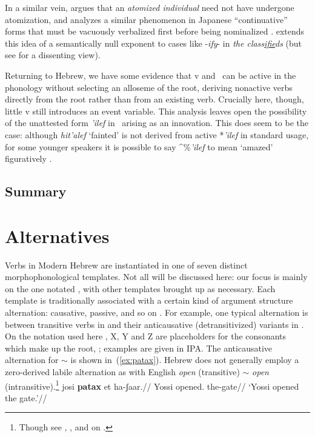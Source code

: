 In a similar vein, \cite{marantz13} argues that an \emph{atomized individual} need not have undergone atomization, and analyzes a similar phenomenon in Japanese ``continuative'' forms that must be vacuously verbalized first{ before being nominalized} \citep{volpe05}. \cite{anagnostopoulou14thli} extends this idea of a semantically null exponent to cases like -\emph{ify}- in \emph{the class\underline{ifie}ds} (but see \citealt{borer14lingua} for a dissenting view).

Returning to Hebrew, we have some evidence that v and \va~can be active in the phonology without selecting an alloseme of the root, deriving nonactive verbs directly from the root rather than from an existing verb. Crucially here, though, little v still introduces an event variable. This analysis leaves open the possibility of the unattested form \emph{'ilef} in \tpie~arising as an innovation. This does seem to be the case: although \emph{hit'alef} `fainted' is not derived from active *\emph{'ilef} in standard usage, for some younger speakers it is possible to say ^{\%}\emph{'ilef} to mean `amazed' figuratively \citep{laks14}.

	\subsection{Summary}


\section{Alternatives} \label{vz:others}
Verbs in Modern Hebrew are instantiated in one of seven distinct morphophonological templates. Not all will be discussed here: our focus is mainly on the one notated {\thit}, with other templates brought up as necessary. Each template is traditionally associated with a certain kind of argument structure alternation: causative, passive, and so on \citep{berman78,doron03,arad05,borer13oup,kastner16phd}. For example, one typical alternation is between transitive verbs in {\tkal} and their anticausative (detransitivized) variants in {\tnif}. On the notation used here , X, Y and Z are placeholders for the consonants which make up the root, ; examples are given in IPA. The anticausative alternation for {\tkal}$\sim${\tnif} is shown in~(\ref{ex:patax}). Hebrew does not generally employ a zero-derived labile alternation as with English \emph{open} (transitive) $\sim$ \emph{open} (intransitive).\footnote{Though see \cite{borer91}, \citet[61]{doron03}, \cite{lev15} and \citet[Chapter~2.3.2]{kastner16phd} on {\thif}.} 
\pex\label{ex:patax}
	\a \begingl
		\gla josi \textbf{patax} et ha-ʃaar.//
		\glb Yossi opened.  the-gate//
		\glft `Yossi opened the gate.'//
		\endgl

